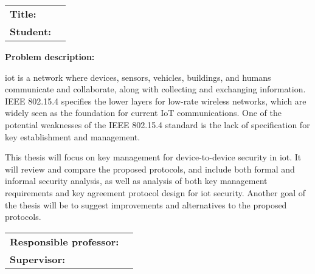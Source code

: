 \begin{titlingpage}

\noindent
\begin{tabular}{@{}p{4cm}l}
\textbf{Title:} 	& \thetitle \\
\textbf{Student:}	& \theauthor \\
\end{tabular}

\vspace{4ex}
\noindent\textbf{Problem description:}
\vspace{2ex}

\noindent
\gls{iot} is a network where devices, sensors, vehicles, buildings, and humans communicate and collaborate, along with collecting and exchanging information. IEEE 802.15.4 specifies the lower layers for low-rate wireless networks, which are widely seen as the foundation for current IoT communications. One of the potential weaknesses of the IEEE 802.15.4 standard is the lack of specification for key establishment and management.

\noindent
This thesis will focus on key management for device-to-device security in \gls{iot}. It will review and compare the proposed protocols, and include both formal and informal security analysis, as well as analysis of both key management requirements and key agreement protocol design for \gls{iot} security. Another goal of the thesis will be to suggest improvements and alternatives to the proposed protocols.

\vspace{6ex}

\noindent
\begin{tabular}{@{}p{4cm}l}
\textbf{Responsible professor:} 	& \theprofessor \\
\textbf{Supervisor:}			& \thesupervisor \\
\end{tabular}

\end{titlingpage}

